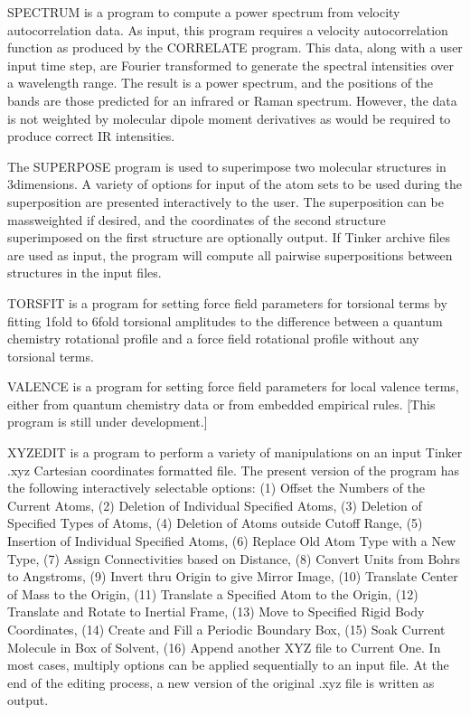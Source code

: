 \documentclass[letterpaper,11pt,english]{sphinxmanual}
\begin{document}
SPECTRUM is a program to compute a power spectrum from velocity autocorrelation data. As input, this program requires a velocity autocorrelation function as produced by the CORRELATE program. This data, along with a user input time step, are Fourier transformed to generate the spectral intensities over a wavelength range. The result is a power spectrum, and the positions of the bands are those predicted for an infrared or Raman spectrum. However, the data is not weighted by molecular dipole moment derivatives as would be required to produce correct IR intensities.


The SUPERPOSE program is used to superimpose two molecular structures in 3\sphinxhyphen{}dimensions. A variety of options for input of the atom sets to be used during the superposition are presented interactively to the user. The superposition can be mass\sphinxhyphen{}weighted if desired, and the coordinates of the second structure superimposed on the first structure are optionally output. If Tinker archive files are used as input, the program will compute all pairwise superpositions between structures in the input files.


TORSFIT is a program for setting force field parameters for torsional terms by fitting 1\sphinxhyphen{}fold to 6\sphinxhyphen{}fold torsional amplitudes to the difference between a quantum chemistry rotational profile and a force field rotational profile without any torsional terms.


VALENCE is a program for setting force field parameters for local valence terms, either from quantum chemistry data or from embedded empirical rules. {[}This program is still under development.{]}


XYZEDIT is a program to perform a variety of manipulations on an input Tinker .xyz Cartesian coordinates formatted file. The present version of the program has the following interactively selectable options: (1) Offset the Numbers of the Current Atoms, (2) Deletion of Individual Specified Atoms, (3) Deletion of Specified Types of Atoms, (4) Deletion of Atoms outside Cutoff Range, (5) Insertion of Individual Specified Atoms, (6) Replace Old Atom Type with a New Type, (7) Assign Connectivities based on Distance, (8) Convert Units from Bohrs to Angstroms, (9) Invert thru Origin to give Mirror Image, (10) Translate Center of Mass to the Origin, (11) Translate a Specified Atom to the Origin, (12) Translate and Rotate to Inertial Frame, (13) Move to Specified Rigid Body Coordinates, (14) Create and Fill a Periodic Boundary Box, (15) Soak Current Molecule in Box of Solvent, (16) Append another XYZ file to Current One. In most cases, multiply options can be applied sequentially to an input file. At the end of the editing process, a new version of the original .xyz file is written as output.
\end{document}
